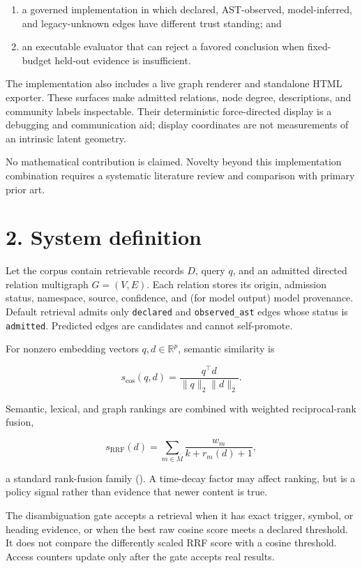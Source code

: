\documentclass[
  english,
  11pt,
]{article}
\providecommand{\tightlist}{%
  \setlength{\itemsep}{0pt}\setlength{\parskip}{0pt}}
\begin{document}
\begin{enumerate}
\def\labelenumi{\arabic{enumi}.}
\tightlist
\item
  a governed implementation in which declared, AST-observed,
  model-inferred, and legacy-unknown edges have different trust
  standing; and
\item
  an executable evaluator that can reject a favored conclusion when
  fixed-budget held-out evidence is insufficient.
\end{enumerate}

The implementation also includes a live graph renderer and standalone
HTML exporter. These surfaces make admitted relations, node degree,
descriptions, and community labels inspectable. Their deterministic
force-directed display is a debugging and communication aid; display
coordinates are not measurements of an intrinsic latent geometry.

No mathematical contribution is claimed. Novelty beyond this
implementation combination requires a systematic literature review and
comparison with primary prior art.

\section{2. System definition}\label{system-definition}

Let the corpus contain retrievable records \(D\), query \(q\), and an
admitted directed relation multigraph \(G=(V,E)\). Each relation stores
its origin, admission status, namespace, source, confidence, and (for
model output) model provenance. Default retrieval admits only
\texttt{declared} and \texttt{observed\_ast} edges whose status is
\texttt{admitted}. Predicted edges are candidates and cannot
self-promote.

For nonzero embedding vectors \(q,d\in\mathbb{R}^p\), semantic
similarity is

\[s_{\mathrm{cos}}(q,d)=\frac{q^\top d}{\lVert q\rVert_2\lVert d\rVert_2}.\]

Semantic, lexical, and graph rankings are combined with weighted
reciprocal-rank fusion,

\[s_{\mathrm{RRF}}(d)=\sum_{m\in M}\frac{w_m}{k+r_m(d)+1},\]

a standard rank-fusion family (). A time-decay factor may affect ranking,
but is a policy signal rather than evidence that newer content is true.

The disambiguation gate accepts a retrieval when it has exact trigger,
symbol, or heading evidence, or when the best raw cosine score meets a
declared threshold. It does not compare the differently scaled RRF score
with a cosine threshold. Access counters update only after the gate
accepts real results.
\end{document}
